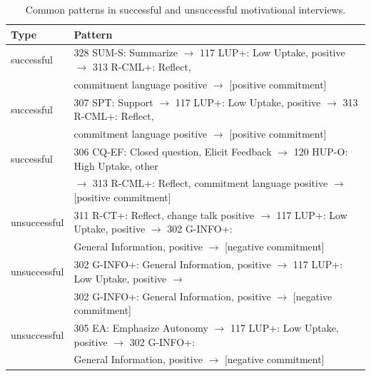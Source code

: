 \documentclass{amia_summit_2018}
\begin{document}
\begin{table}[h]
\centering
\caption{Common patterns in successful and unsuccessful motivational interviews.}
\label{tab:common_patterns}
  \begin{tabular}{|l|l|}
  \hline
   \textbf{Type} & \textbf{Pattern} \\ \hline      
successful & 328 SUM-S: Summarize $\rightarrow $ 117 LUP+: Low Uptake, positive $\rightarrow $ 313 R-CML+: Reflect, \\ 
& commitment language positive $\rightarrow $ [positive commitment] \\\hline
successful & 307 SPT: Support $\rightarrow $ 117 LUP+: Low Uptake, positive $\rightarrow $ 313 R-CML+: Reflect, \\
& commitment language positive $\rightarrow $ [positive commitment] \\\hline
successful & 306 CQ-EF: Closed question, Elicit Feedback $\rightarrow $ 120 HUP-O: High Uptake, other \\
& $\rightarrow $ 313 R-CML+: Reflect, commitment language positive $\rightarrow $ [positive commitment] \\\hline
unsuccessful & 311 R-CT+: Reflect, change talk positive $\rightarrow $ 117 LUP+: Low Uptake, positive $\rightarrow $ 302 G-INFO+:  \\
& General Information, positive $\rightarrow $ [negative commitment] \\\hline
unsuccessful & 302 G-INFO+: General Information, positive $\rightarrow $ 117 LUP+: Low Uptake, positive $\rightarrow $  \\
& 302 G-INFO+: General Information, positive $\rightarrow $ [negative commitment] \\\hline
unsuccessful & 305 EA: Emphasize Autonomy $\rightarrow $ 117 LUP+: Low Uptake, positive $\rightarrow $ 302 G-INFO+:  \\
& General Information, positive $\rightarrow $ [negative commitment] \\\hline
  \end{tabular}
\end{table} 
\end{document}
